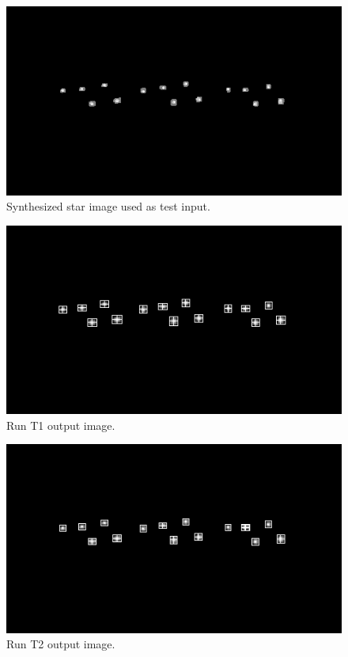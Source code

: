 \documentclass[12pt]{report}
\begin{document}
\begin{figure}[h]
    \centering
    \includegraphics[scale=1.2]{results/t_in.png}
    \caption{Synthesized star image used as test input.}
    \label{res:t_in}
\end{figure}
\begin{figure}[h]
    \centering
    \includegraphics[scale=1.2]{results/t0.png}
    \caption{Run T1 output image.}
    \label{res:t0}
\end{figure}
\begin{figure}[h]
    \centering
    \includegraphics[scale=1.2]{results/t1.png}
    \caption{Run T2 output image.}
    \label{res:t1}
\end{figure}
\end{document}
